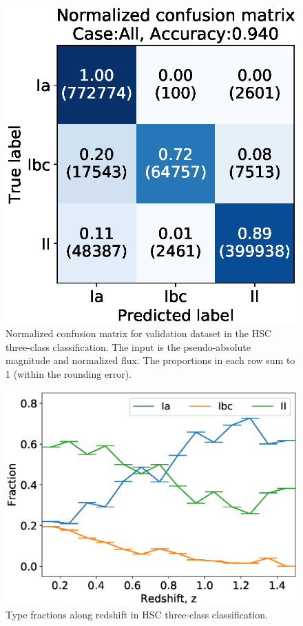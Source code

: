 \documentclass[useamsfonts]{pasj01}
\begin{document}
%
%
\begin{figure}[htbp]
  \begin{center}
     \includegraphics[width=\columnwidth]{figures/13_CM_abs-mag_scaled-flux_w-mixup_remove-y_predictions_validation_2_Flagall_weighted.eps}
  \end{center}
  \caption{%
  Normalized confusion matrix for validation dataset in the HSC three-class classification.
  The input is the pseudo-absolute magnitude and normalized flux.
  The proportions in each row sum to 1 (within the rounding error).
  }%
  \label{fig:h3_validation_CM}
\end{figure}
%
%
%
\begin{figure}[htbp]
  \begin{center}
     \includegraphics[width=\columnwidth]{figures/SNfrac_alongz.eps}
  \end{center}
  \caption{%
  Type fractions along redshift in HSC three-class classification.
  }%
  \label{fig:hsc3_type_frac_alongz}
\end{figure}
%
\end{document}
